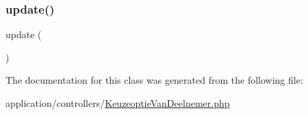 \mbox{\label{class_keuze_optie_van_deelnemer_a842e4774e3b3601a005b995c02f7e883}} 
\subsubsection{\texorpdfstring{update()}{update()}}
{\footnotesize\ttfamily update (\begin{DoxyParamCaption}{ }\end{DoxyParamCaption})}



The documentation for this class was generated from the following file\+:\begin{DoxyCompactItemize}
\item 
application/controllers/\mbox{\hyperlink{_keuzeoptie_van_deelnemer_8php}{Keuzeoptie\+Van\+Deelnemer.\+php}}\end{DoxyCompactItemize}
